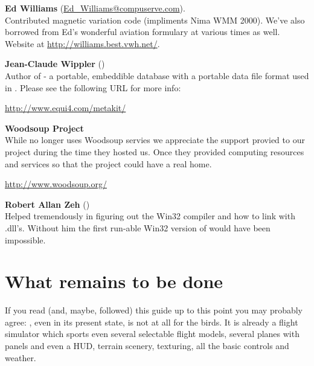 \noindent \textbf{Ed Williams}
(\href{Ed_Williams@compuserve.com}{Ed\_Williams@compuserve.com}).\\
  Contributed magnetic variation code (impliments Nima WMM 2000).
  We've also borrowed from Ed's wonderful aviation formulary at various
  times as well. Website at
  \medskip
  \href{http://williams.best.vwh.net/}{http://williams.best.vwh.net/}.
 \medskip

 \noindent \textbf{Jean-Claude Wippler}
 ()\\
  Author of  - a portable, embeddible database with a portable
  data file format used in \FlightGear{}. Please see the following URL for more info:
 \medskip

  \href{http://www.equi4.com/metakit/}{http://www.equi4.com/metakit/}
  \medskip

\noindent \textbf{Woodsoup Project}\\

  While \FlightGear{} no longer uses Woodsoup servies we appreciate the
  support provied to our project during the time they hosted us. Once they
  provided computing resources and services so that the \FlightGear{} project
  could have a real home.

\href{http://www.woodsoup.org/}{http://www.woodsoup.org/}
  \medskip

\noindent \textbf{Robert Allan Zeh} ()\\
  Helped tremendously in figuring out the  Win32 compiler and
  how to link with .dll's.  Without him the first run-able Win32
  version of \FlightGear{} would have been impossible.

\section{What remains to be done}

If you read (and, maybe, followed) this guide up to this point you may probably agree: \FlightGear{}$\!$, even in its present state, is not at all for the birds. It is
already a flight simulator which sports even several selectable flight models, several planes with panels and even a HUD, terrain scenery, texturing, all the basic controls and weather.

